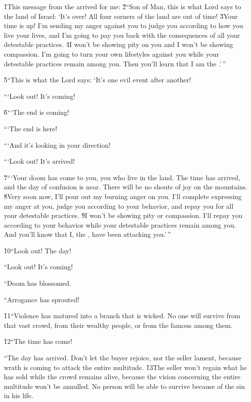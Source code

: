 \v{1}This message from the  arrived for me: \v{2}``Son of Man, this is what Lord  says to the land of Israel: `It's over! All four corners of the land are out of time! \v{3}Your time is up! I'm sending my anger against you to judge you according to how you live your lives, and I'm going to pay you back with the consequences of all your detestable practices. \v{4}I won't be showing pity on you and I won't be showing compassion. I'm going to turn your own lifestyles against you while your detestable practices remain among you. Then you'll learn that I am the .'\,''

\v{5}``This is what the Lord  says: `It's one evil event after another!

```Look out! It's coming!

\v{6}```The end is coming!

```The end is here!

```And it's looking in your direction!

```Look out! It's arrived!

\v{7}```Your doom has come to you, you who live in the land. The time has arrived, and the day of confusion is near. There will be no shouts of joy on the mountains. \v{8}Very soon now, I'll pour out my burning anger on you. I'll complete expressing my anger at you, judge you according to your behavior, and repay you for all your detestable practices. \v{9}I won't be showing pity or compassion. I'll repay you according to your behavior while your detestable practices remain among you. And you'll know that I, the , have been attacking you.'\,''

\v{10}``Look out! The day!

``Look out! It's coming!

``Doom has blossomed.

``Arrogance has sprouted!

\v{11}``Violence has matured into a branch that is wicked. No one will survive from that vast crowd, from their wealthy people, or from the famous among them.

\v{12}``The time has come!

``The day has arrived. Don't let the buyer rejoice, nor the seller lament, because wrath is coming to attack the entire multitude. \v{13}The seller won't regain what he has sold while the crowd remains alive, because the vision concerning the entire multitude won't be annulled. No person will be able to survive because of the sin in his life.

